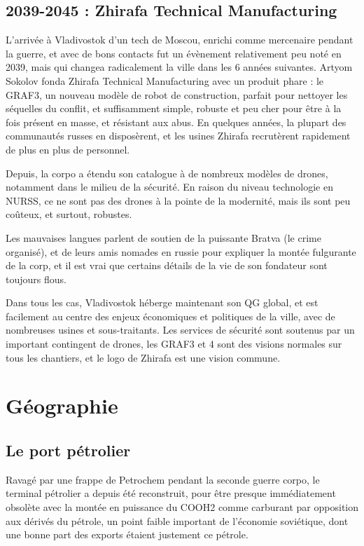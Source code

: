 \documentclass[10pt,a4paper]{book}
\begin{document}
\section{2039-2045 : Zhirafa Technical Manufacturing}
L'arrivée à Vladivostok d'un tech de Moscou, enrichi comme mercenaire pendant la guerre, et avec de bons contacts fut un évènement relativement peu noté en 2039, mais qui changea radicalement la ville dans les 6 années suivantes. Artyom Sokolov fonda Zhirafa Technical Manufacturing avec un produit phare : le GRAF3, un nouveau modèle de robot de construction, parfait pour nettoyer les séquelles du conflit, et suffisamment simple, robuste et peu cher pour être à la fois présent en masse, et résistant aux abus. En quelques années, la plupart des communautés russes en disposèrent, et les usines Zhirafa recrutèrent rapidement de plus en plus de personnel. 

Depuis, la corpo a étendu son catalogue à de nombreux modèles de drones, notamment dans le milieu de la sécurité. En raison du niveau technologie en NURSS, ce ne sont pas des drones à la pointe de la modernité, mais ils sont peu coûteux, et surtout, robustes.

Les mauvaises langues parlent de soutien de la puissante Bratva (le crime organisé), et de leurs amis nomades en russie pour expliquer la montée fulgurante de la corp, et il est vrai que certains détails de la vie de son fondateur sont toujours flous.

Dans tous les cas, Vladivostok héberge maintenant son QG global, et est facilement au centre des enjeux économiques et politiques de la ville, avec de nombreuses usines et sous-traitants. Les services de sécurité sont soutenus par un important contingent de drones, les GRAF3 et 4 sont des visions normales sur tous les chantiers, et le logo de Zhirafa est une vision commune.
\chapter{Géographie}
\section{Le port pétrolier}
Ravagé par une frappe de Petrochem pendant la seconde guerre corpo, le terminal pétrolier a depuis été reconstruit, pour être presque immédiatement obsolète avec la montée en puissance du COOH2 comme carburant par opposition aux dérivés du pétrole, un point faible important de l'économie soviétique, dont une bonne part des exports étaient justement ce pétrole. 
\end{document}
